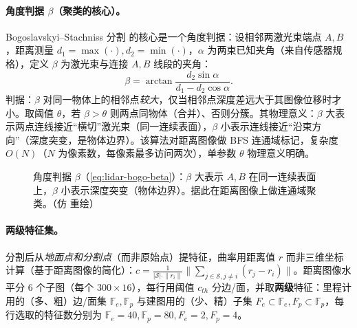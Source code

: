 \paragraph{角度判据 $\beta$（聚类的核心）。}
Bogoslavskyi–Stachniss 分割\cite{bogoslavskyi2016fast} 的核心是一个角度判据：设相邻两激光束端点 $A,B$，距离测量 $d_1=\max(\cdot),d_2=\min(\cdot)$，$\alpha$ 为两束已知夹角（来自传感器规格），定义 $\beta$ 为激光束与连接 $A,B$ 线段的夹角：
\begin{equation}
  \beta=\arctan\frac{d_2\sin\alpha}{d_1-d_2\cos\alpha}.
  \label{eq:lidar-bogo-beta}
\end{equation}
判据：$\beta$ 对同一物体上的相邻点\emph{较大}，仅当相邻点深度差远大于其图像位移时才小。取阈值 $\theta$，若 $\beta>\theta$ 则两点同物体（合并）、否则分簇。其物理意义：$\beta$ 大表示两点连线接近“横切”激光束（同一连续表面），$\beta$ 小表示连线接近“沿束方向”（深度突变，是物体边界）。该算法对距离图像做 BFS 连通域标记，复杂度 $O(N)$（$N$ 为像素数，每像素最多访问两次），单参数 $\theta$ 物理意义明确。

\begin{figure}[ht]
\centering
{}
\caption{角度判据 $\beta$（\cref{eq:lidar-bogo-beta}）：$\beta$ 大表示 $A,B$ 在同一连续表面上，$\beta$ 小表示深度突变（物体边界）。据此在距离图像上做连通域聚类。（仿 \cite{bogoslavskyi2016fast} 重绘）}
\label{fig:lidar-bogo}
\end{figure}

\paragraph{两级特征集。}
分割后从\emph{地面点和分割点}（而非原始点）提特征，曲率用距离值 $r$ 而非三维坐标计算（基于距离图像的简化）：$c=\frac{1}{|\mathcal{S}|\cdot\|r_i\|}\big\|\sum_{j\in\mathcal{S},j\neq i}(r_j-r_i)\big\|$。距离图像水平分 $6$ 个子图（每个 $300\times16$），每行用阈值 $c_{th}$ 分边/面，并取\textbf{两级}特征\cite{shan2018legoloam}：里程计用的（多、粗）边/面集 $\mathbb{F}_e,\mathbb{F}_p$ 与建图用的（少、精）子集 $F_e\subset\mathbb{F}_e,F_p\subset\mathbb{F}_p$，每行选取的特征数分别为 $\mathbb{F}_e{=}40,\mathbb{F}_p{=}80,F_e{=}2,F_p{=}4$。

